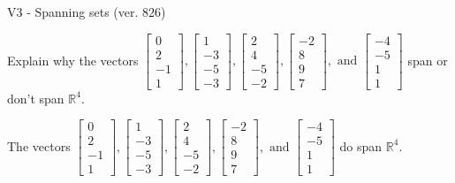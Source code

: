 \begin{exercise}
  \begin{exerciseTitle}V3 - Spanning sets (ver. 826)\end{exerciseTitle}
  \begin{exerciseStatement}
    Explain why the vectors \(\left[\begin{array}{r}
0 \\
2 \\
-1 \\
1
\end{array}\right] , \left[\begin{array}{r}
1 \\
-3 \\
-5 \\
-3
\end{array}\right] , \left[\begin{array}{r}
2 \\
4 \\
-5 \\
-2
\end{array}\right] , \left[\begin{array}{r}
-2 \\
8 \\
9 \\
7
\end{array}\right] , \text{ and } \left[\begin{array}{r}
-4 \\
-5 \\
1 \\
1
\end{array}\right]\) span or don't span \(\mathbb{R}^4\). 
	


  \end{exerciseStatement}
  \begin{exerciseAnswer}
   The vectors \(\left[\begin{array}{r}
0 \\
2 \\
-1 \\
1
\end{array}\right] , \left[\begin{array}{r}
1 \\
-3 \\
-5 \\
-3
\end{array}\right] , \left[\begin{array}{r}
2 \\
4 \\
-5 \\
-2
\end{array}\right] , \left[\begin{array}{r}
-2 \\
8 \\
9 \\
7
\end{array}\right] , \text{ and } \left[\begin{array}{r}
-4 \\
-5 \\
1 \\
1
\end{array}\right]\) 
  	 do  
	span \(\mathbb{R}^4\).
  



\end{exerciseAnswer}
\end{exercise}
